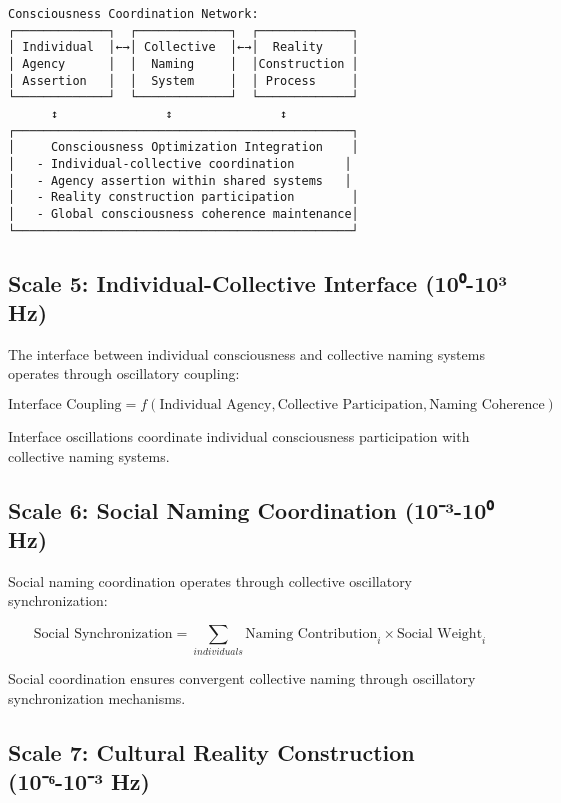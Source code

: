 \documentclass[12pt,a4paper]{article}
\begin{document}
\begin{verbatim}
Consciousness Coordination Network:
┌─────────────┐  ┌─────────────┐  ┌─────────────┐
│ Individual  │←→│ Collective  │←→│  Reality    │
│ Agency      │  │  Naming     │  │Construction │
│ Assertion   │  │  System     │  │ Process     │
└─────────────┘  └─────────────┘  └─────────────┘
      ↕               ↕               ↕
┌───────────────────────────────────────────────┐
│     Consciousness Optimization Integration    │
│   - Individual-collective coordination       │
│   - Agency assertion within shared systems   │
│   - Reality construction participation        │
│   - Global consciousness coherence maintenance│
└───────────────────────────────────────────────┘
\end{verbatim}

\subsection{Scale 5: Individual-Collective Interface (10⁰-10³ Hz)}

The interface between individual consciousness and collective naming systems operates through oscillatory coupling:

\begin{equation}
\text{Interface Coupling} = f(\text{Individual Agency}, \text{Collective Participation}, \text{Naming Coherence})
\end{equation}

Interface oscillations coordinate individual consciousness participation with collective naming systems.

\subsection{Scale 6: Social Naming Coordination (10⁻³-10⁰ Hz)}

Social naming coordination operates through collective oscillatory synchronization:

\begin{equation}
\text{Social Synchronization} = \sum_{individuals} \text{Naming Contribution}_i \times \text{Social Weight}_i
\end{equation}

Social coordination ensures convergent collective naming through oscillatory synchronization mechanisms.

\subsection{Scale 7: Cultural Reality Construction (10⁻⁶-10⁻³ Hz)}
\end{document}
